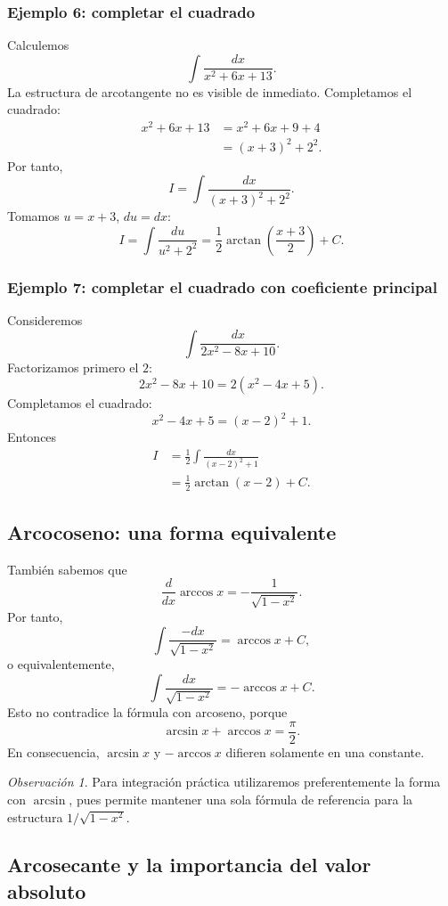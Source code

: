 \documentclass[12pt]{article}
\theoremstyle{definition}
\theoremstyle{remark}
\newtheorem*{observacion}{Observación}
\begin{document}
\subsubsection*{Ejemplo 6: completar el cuadrado}
Calculemos
\[
\int\frac{dx}{x^2+6x+13}.
\]
La estructura de arcotangente no es visible de inmediato. Completamos el
cuadrado:
\begin{align*}
x^2+6x+13
&=x^2+6x+9+4\\
&=(x+3)^2+2^2.
\end{align*}
Por tanto,
\[
I=\int\frac{dx}{(x+3)^2+2^2}.
\]
Tomamos $u=x+3$, $du=dx$:
\[
I=\int\frac{du}{u^2+2^2}
=\boxed{\frac12\arctan\left(\frac{x+3}{2}\right)+C}.
\]

\subsubsection*{Ejemplo 7: completar el cuadrado con coeficiente principal}
Consideremos
\[
\int\frac{dx}{2x^2-8x+10}.
\]
Factorizamos primero el $2$:
\[
2x^2-8x+10=2(x^2-4x+5).
\]
Completamos el cuadrado:
\[
x^2-4x+5=(x-2)^2+1.
\]
Entonces
\begin{align*}
I
&=\frac12\int\frac{dx}{(x-2)^2+1}\\
&=\boxed{\frac12\arctan(x-2)+C}.
\end{align*}

\subsection{Arcocoseno: una forma equivalente}

También sabemos que
\[
\frac{d}{dx}\arccos x=-\frac1{\sqrt{1-x^2}}.
\]
Por tanto,
\[
\int\frac{-dx}{\sqrt{1-x^2}}=\arccos x+C,
\]
o equivalentemente,
\[
\int\frac{dx}{\sqrt{1-x^2}}=-\arccos x+C.
\]
Esto no contradice la fórmula con arcoseno, porque
\[
\arcsin x+\arccos x=\frac\pi2.
\]
En consecuencia, $\arcsin x$ y $-\arccos x$ difieren solamente en una
constante.

\begin{observacion}
Para integración práctica utilizaremos preferentemente la forma con
$\arcsin$, pues permite mantener una sola fórmula de referencia para la
estructura $1/\sqrt{1-x^2}$.
\end{observacion}

\subsection{Arcosecante y la importancia del valor absoluto}
\end{document}
